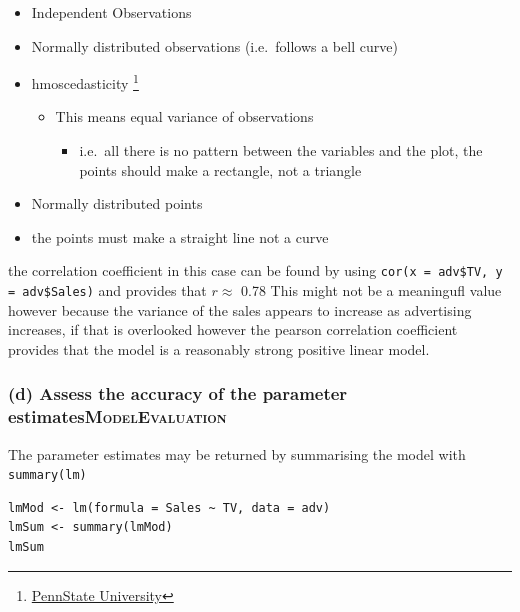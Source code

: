 \documentclass[11pt]{article}
\begin{document}
\begin{itemize}
\item Independent Observations
\item Normally distributed observations (i.e. follows a bell curve)
\item hmoscedasticity \footnote{\href{newonlinecourses.science.psu.edu/stat501}{PennState
University}}

\begin{itemize}
\item This means equal variance of observations

\begin{itemize}
\item i.e. all there is no pattern between the variables and the plot,
the points should make a rectangle, not a triangle
\end{itemize}
\end{itemize}

\item Normally distributed points
\item the points must make a straight line not a curve
\end{itemize}

the correlation coefficient in this case can be found by using
\texttt{cor(x = adv\$TV, y = adv\$Sales)} and provides that \(r \approx\) 0.78 This
might not be a meaningufl value however because the variance of the
sales appears to increase as advertising increases, if that is
overlooked however the pearson correlation coefficient provides that the
model is a reasonably strong positive linear model.
\subsubsection{(d) Assess the accuracy of the parameter estimates\hfill{}\textsc{ModelEvaluation}}
\label{sec:orga5b4169}
The parameter estimates may be returned by summarising the model with
\texttt{summary(lm)}

\begin{verbatim}
lmMod <- lm(formula = Sales ~ TV, data = adv)
lmSum <- summary(lmMod)
lmSum
\end{verbatim}
\end{document}
